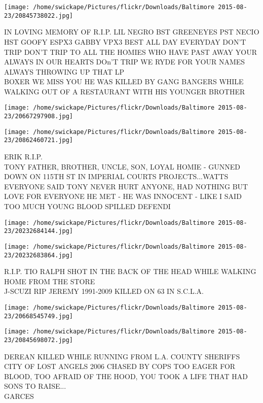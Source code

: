 \documentclass[10pt,letterpaper]{article}
\begin{document}
\vspace{0.25in}
\texttt{[image: /home/swickape/Pictures/flickr/Downloads/Baltimore 2015-08-23/20845738022.jpg]}

IN LOVING MEMORY OF R.I.P. LIL NEGRO BST GREENEYES PST NECIO HST GOOFY ESPX3 GABBY VPX3 BEST ALL DAY EVERYDAY DON'T TRIP DON'T TRIP TO ALL THE HOMIES WHO HAVE PAST AWAY YOUR ALWAYS IN OUR HEARTS DOn'T TRIP WE RYDE FOR YOUR NAMES ALWAYS THROWING UP THAT LP\\
BOXER WE MISS YOU HE WAS KILLED BY GANG BANGERS WHILE WALKING OUT OF A RESTAURANT WITH HIS YOUNGER BROTHER\\
\pagebreak

\texttt{[image: /home/swickape/Pictures/flickr/Downloads/Baltimore 2015-08-23/20667297908.jpg]}

\vspace{0.25in}
\texttt{[image: /home/swickape/Pictures/flickr/Downloads/Baltimore 2015-08-23/20862460721.jpg]}

ERIK R.I.P.\\
TONY FATHER, BROTHER, UNCLE, SON, LOYAL HOMIE {-} GUNNED DOWN ON 115TH ST IN IMPERIAL COURTS PROJECTS...WATTS EVERYONE SAID TONY NEVER HURT ANYONE, HAD NOTHING BUT LOVE FOR EVERYONE HE MET {-} HE WAS INNOCENT {-} LIKE I SAID TOO MUCH YOUNG BLOOD SPILLED DEFENDI\\
\pagebreak

\texttt{[image: /home/swickape/Pictures/flickr/Downloads/Baltimore 2015-08-23/20232684144.jpg]}

\vspace{0.25in}
\texttt{[image: /home/swickape/Pictures/flickr/Downloads/Baltimore 2015-08-23/20232683864.jpg]}

R.I.P. TIO RALPH SHOT IN THE BACK OF THE HEAD WHILE WALKING HOME FROM THE STORE\\
J{-}SCUZI RIP JEREMY 1991{-}2009 KILLED ON 63 IN S.C.L.A.\\
\pagebreak

\texttt{[image: /home/swickape/Pictures/flickr/Downloads/Baltimore 2015-08-23/20668545749.jpg]}

\vspace{0.25in}
\texttt{[image: /home/swickape/Pictures/flickr/Downloads/Baltimore 2015-08-23/20845698072.jpg]}

DEREAN KILLED WHILE RUNNING FROM L.A. COUNTY SHERIFFS CITY OF LOST ANGELS 2006 CHASED BY COPS TOO EAGER FOR BLOOD, TOO AFRAID OF THE HOOD, YOU TOOK A LIFE THAT HAD SONS TO RAISE...\\
GARCES\\
\pagebreak
\end{document}
